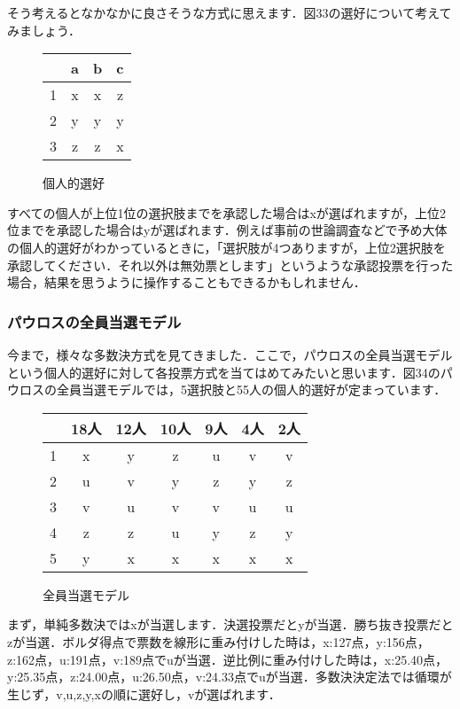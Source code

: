 そう考えるとなかなかに良さそうな方式に思えます．図33の選好について考えてみましょう．
\begin{figure}[!h]
    \centering
    \begin{tabular}[!h]{|c|c|c|c|} \hline
          & a & b & c \\ \hline
        1 & x & x & z \\ \hline
        2 & y & y & y \\ \hline
        3 & z & z & x \\ \hline
    \end{tabular}
    \caption{個人的選好}
\end{figure}
すべての個人が上位1位の選択肢までを承認した場合はxが選ばれますが，上位2位までを承認した場合はyが選ばれます．例えば事前の世論調査などで予め大体の個人的選好がわかっているときに，「選択肢が4つありますが，上位2選択肢を承認してください．それ以外は無効票とします」というような承認投票を行った場合，結果を思うように操作することもできるかもしれません．

\subsubsection*{パウロスの全員当選モデル}
今まで，様々な多数決方式を見てきました．ここで，パウロスの全員当選モデルという個人的選好に対して各投票方式を当てはめてみたいと思います．図34のパウロスの全員当選モデルでは，5選択肢と55人の個人的選好が定まっています．

\begin{figure}[!h]
    \centering
    \begin{tabular}[!h]{|c|c|c|c|c|c|c|} \hline
           & 18人 & 12人 & 10人 & 9人 & 4人 & 2人 \\ \hline
         1 & x    & y    & z    & u   & v   & v   \\ \hline
         2 & u    & v    & y    & z   & y   & z   \\ \hline
         3 & v    & u    & v    & v   & u   & u   \\ \hline
         4 & z    & z    & u    & y   & z   & y   \\ \hline
         5 & y    & x    & x    & x   & x   & x   \\ \hline
    \end{tabular}
    \caption{全員当選モデル}
\end{figure}

まず，単純多数決ではxが当選します．決選投票だとyが当選．勝ち抜き投票だとzが当選．ボルダ得点で票数を線形に重み付けした時は，x:127点，y:156点，z:162点，u:191点，v:189点でuが当選．逆比例に重み付けした時は，x:25.40点，y:25.35点，z:24.00点，u:26.50点，v:24.33点でuが当選．多数決決定法では循環が生じず，v,u,z,y,xの順に選好し，vが選ばれます．

